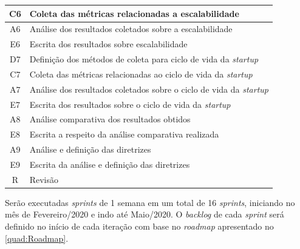 \begin{quadro}
\begin{tabular}{ | c | m{12cm} | }
        C6 & Coleta das métricas relacionadas a escalabilidade \\ \hline
        A6 & Análise dos resultados coletados sobre a escalabilidade \\ \hline
        E6 & Escrita dos resultados sobre escalabilidade \\ \hline
        D7 & Definição dos métodos de coleta para ciclo de vida da \textit{startup} \\ \hline
        C7 & Coleta das métricas relacionadas ao ciclo de vida da \textit{startup} \\ \hline
        A7 & Análise dos resultados coletados sobre o ciclo de vida da \textit{startup} \\ \hline
        E7 & Escrita dos resultados sobre o ciclo de vida da \textit{startup} \\ \hline
        A8 & Análise comparativa dos resultados obtidos \\ \hline
        E8 & Escrita a respeito da análise comparativa realizada \\ \hline
        A9 & Análise e definição das diretrizes \\ \hline
        E9 & Escrita da análise e definição das diretrizes \\ \hline
        R  & Revisão
    \end{tabular}
\end{quadro}

Serão executadas \textit{sprints} de 1 semana em um total de 16 \textit{sprints},
iniciando no mês de Fevereiro/2020 e indo até Maio/2020. O \textit{backlog} de cada
\textit{sprint} será definido no início de cada iteração com base no \textit{roadmap}
apresentado no \autoref{quad:Roadmap}.

